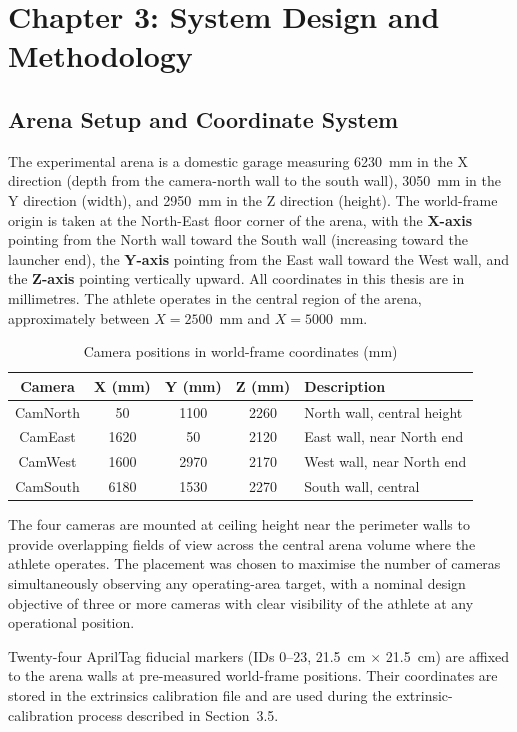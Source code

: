 \chapter{Chapter 3: System Design and Methodology}

\section{Arena Setup and Coordinate System}

The experimental arena is a domestic garage measuring 6230~mm in the X direction (depth from the camera-north wall to the south wall), 3050~mm in the Y direction (width), and 2950~mm in the Z direction (height). The world-frame origin is taken at the North-East floor corner of the arena, with the \textbf{X-axis} pointing from the North wall toward the South wall (increasing toward the launcher end), the \textbf{Y-axis} pointing from the East wall toward the West wall, and the \textbf{Z-axis} pointing vertically upward. All coordinates in this thesis are in millimetres. The athlete operates in the central region of the arena, approximately between $X=2500$~mm and $X=5000$~mm.

\begin{table}[htbp]
\caption{Camera positions in world-frame coordinates (mm)}
\label{tab:3_1}
\begin{tabular}{|c|c|c|c|p{3.5cm}|}
\hline
\textbf{Camera} & \textbf{X (mm)} & \textbf{Y (mm)} & \textbf{Z (mm)} & \textbf{Description} \\
\hline
CamNorth & 50 & 1100 & 2260 & North wall, central height \\
\hline
CamEast & 1620 & 50 & 2120 & East wall, near North end \\
\hline
CamWest & 1600 & 2970 & 2170 & West wall, near North end \\
\hline
CamSouth & 6180 & 1530 & 2270 & South wall, central \\
\hline
\end{tabular}
\end{table}

The four cameras are mounted at ceiling height near the perimeter walls to provide overlapping fields of view across the central arena volume where the athlete operates. The placement was chosen to maximise the number of cameras simultaneously observing any operating-area target, with a nominal design objective of three or more cameras with clear visibility of the athlete at any operational position.

Twenty-four AprilTag fiducial markers (IDs 0--23, 21.5~cm $\times$ 21.5~cm) are affixed to the arena walls at pre-measured world-frame positions. Their coordinates are stored in the extrinsics calibration file and are used during the extrinsic-calibration process described in Section~3.5.

